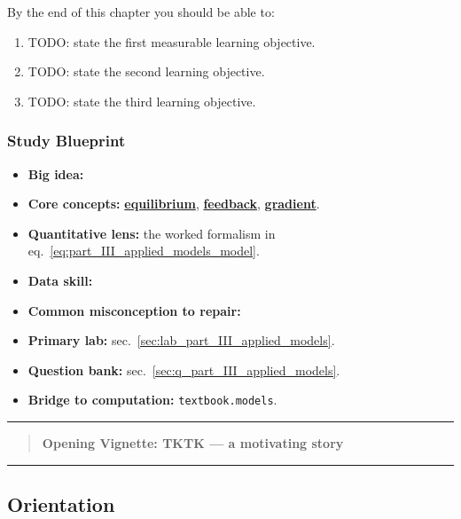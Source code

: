 \documentclass[
]{article}
\providecommand{\tightlist}{%
  \setlength{\itemsep}{0pt}\setlength{\parskip}{0pt}}
\theoremstyle{plain}
\theoremstyle{definition}
\begin{document}
By the end of this chapter you should be able to:

\begin{enumerate}
\def\labelenumi{\arabic{enumi}.}
\item
  TODO: state the first measurable learning objective.
\item
  TODO: state the second learning objective.
\item
  TODO: state the third learning objective.
\end{enumerate}

\subsubsection{Study Blueprint}\label{study-blueprint-9}

\begin{itemize}
\tightlist
\item
  \textbf{Big idea:}
\item
  \textbf{Core concepts:}
  \hyperref[gl:equilibrium]{\textbf{equilibrium}},
  \hyperref[gl:feedback]{\textbf{feedback}},
  \hyperref[gl:gradient]{\textbf{gradient}}.
\item
  \textbf{Quantitative lens:} the worked formalism in
  eq.~\ref{eq:part_III_applied_models_model}.
\item
  \textbf{Data skill:}
\item
  \textbf{Common misconception to repair:}
\item
  \textbf{Primary lab:} sec.~\ref{sec:lab_part_III_applied_models}.
\item
  \textbf{Question bank:} sec.~\ref{sec:q_part_III_applied_models}.
\item
  \textbf{Bridge to computation:} \texttt{textbook.models}.
\end{itemize}

\begin{center}\rule{0.5\linewidth}{0.5pt}\end{center}

\begin{quote}
\textbf{Opening Vignette: TKTK --- a motivating story}
\end{quote}

\begin{center}\rule{0.5\linewidth}{0.5pt}\end{center}

\subsection{Orientation}\label{orientation-8}
\end{document}
